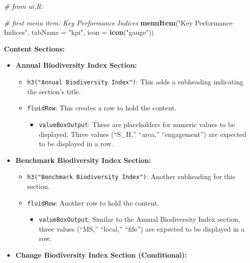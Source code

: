 \documentclass[
]{book}
\newenvironment{Shaded}{\begin{snugshade}}{\end{snugshade}}
\newcommand{\AttributeTok}[1]{\textcolor[rgb]{0.13,0.29,0.53}{#1}}
\newcommand{\CommentTok}[1]{\textcolor[rgb]{0.56,0.35,0.01}{\textit{#1}}}
\newcommand{\FunctionTok}[1]{\textcolor[rgb]{0.13,0.29,0.53}{\textbf{#1}}}
\newcommand{\NormalTok}[1]{#1}
\newcommand{\StringTok}[1]{\textcolor[rgb]{0.31,0.60,0.02}{#1}}
\providecommand{\tightlist}{%
  \setlength{\itemsep}{0pt}\setlength{\parskip}{0pt}}
\begin{document}
\begin{Shaded}
\begin{Highlighting}[]
\CommentTok{\# from ui.R:}

\CommentTok{\# first menu item: Key Performance Indices}
\FunctionTok{menuItem}\NormalTok{(}\StringTok{"Key Performance Indices"}\NormalTok{, }\AttributeTok{tabName =} \StringTok{"kpi"}\NormalTok{, }\AttributeTok{icon =} \FunctionTok{icon}\NormalTok{(}\StringTok{"gauge"}\NormalTok{))}
\end{Highlighting}
\end{Shaded}

\textbf{Content Sections:}

\begin{itemize}
\tightlist
\item
  \textbf{Annual Biodiversity Index Section:}

  \begin{itemize}
  \tightlist
  \item
    \texttt{h3("Annual\ Biodiversity\ Index")}: This adds a subheading indicating the section's title.
  \item
    \texttt{fluidRow}: This creates a row to hold the content.

    \begin{itemize}
    \tightlist
    \item
      \texttt{valueBoxOutput}: These are placeholders for numeric values to be displayed. Three values (``S\_H,'' ``area,'' ``engagement'') are expected to be displayed in a row.
    \end{itemize}
  \end{itemize}
\item
  \textbf{Benchmark Biodiversity Index Section:}

  \begin{itemize}
  \tightlist
  \item
    \texttt{h3("Benchmark\ Biodiversity\ Index")}: Another subheading for this section.
  \item
    \texttt{fluidRow}: Another row to hold the content.

    \begin{itemize}
    \tightlist
    \item
      \texttt{valueBoxOutput}: Similar to the Annual Biodiversity Index section, three values (``MS,'' ``local,'' ``fife'') are expected to be displayed in a row.
    \end{itemize}
  \end{itemize}
\item
  \textbf{Change Biodiversity Index Section (Conditional):}


\end{itemize}
\end{document}
